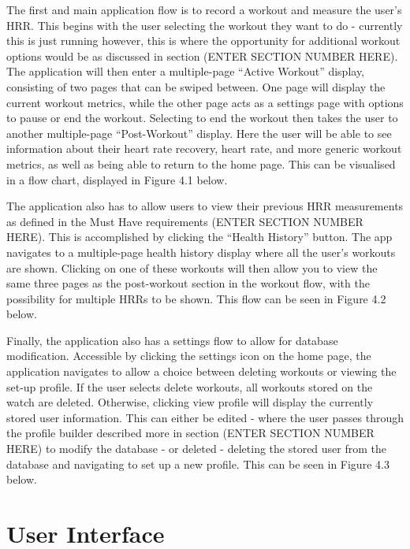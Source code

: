 \documentclass{l4proj}
\begin{document}
The first and main application flow is to record a workout and measure the user’s HRR. This begins with the user selecting the workout they want to do - currently this is just running however, this is where the opportunity for additional workout options would be as discussed in section (ENTER SECTION NUMBER HERE). The application will then enter a multiple-page “Active Workout” display, consisting of two pages that can be swiped between. One page will display the current workout metrics, while the other page acts as a settings page with options to pause or end the workout. Selecting to end the workout then takes the user to another multiple-page “Post-Workout” display. Here the user will be able to see information about their heart rate recovery, heart rate, and more generic workout metrics, as well as being able to return to the home page. This can be visualised in a flow chart, displayed in Figure 4.1 below.



The application also has to allow users to view their previous HRR measurements as defined in the Must Have requirements (ENTER SECTION NUMBER HERE). This is accomplished by clicking the “Health History” button. The app navigates to a multiple-page health history display where all the user’s workouts are shown. Clicking on one of these workouts will then allow you to view the same three pages as the post-workout section in the workout flow, with the possibility for multiple HRRs to be shown. This flow can be seen in Figure 4.2 below.



Finally, the application also has a settings flow to allow for database modification. Accessible by clicking the settings icon on the home page, the application navigates to allow a choice between deleting workouts or viewing the set-up profile. If the user selects delete workouts, all workouts stored on the watch are deleted. Otherwise, clicking view profile will display the currently stored user information. This can either be edited - where the user passes through the profile builder described more in section (ENTER SECTION NUMBER HERE) to modify the database - or deleted - deleting the stored user from the database and navigating to set up a new profile. This can be seen in Figure 4.3 below.

\section{User Interface}
\end{document}
